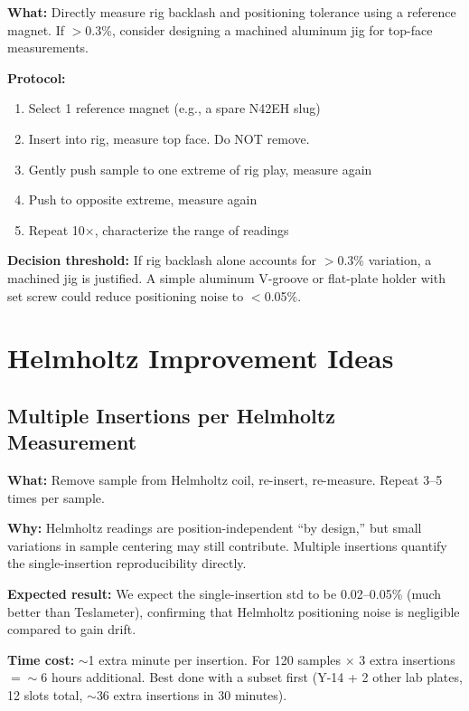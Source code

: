 \documentclass[11pt,letterpaper]{article}
\begin{document}
\textbf{What:} Directly measure rig backlash and positioning tolerance using a
reference magnet. If $>$0.3\%, consider designing a machined aluminum jig for
top-face measurements.

\textbf{Protocol:}
\begin{enumerate}[nosep]
  \item Select 1 reference magnet (e.g., a spare N42EH slug)
  \item Insert into rig, measure top face. Do NOT remove.
  \item Gently push sample to one extreme of rig play, measure again
  \item Push to opposite extreme, measure again
  \item Repeat 10$\times$, characterize the range of readings
\end{enumerate}

\textbf{Decision threshold:} If rig backlash alone accounts for $>$0.3\%
variation, a machined jig is justified. A simple aluminum V-groove or flat-plate
holder with set screw could reduce positioning noise to $<$0.05\%.


\section{Helmholtz Improvement Ideas}
\label{sec:helmholtz-improve}

\subsection{Multiple Insertions per Helmholtz Measurement}
\label{sec:helm-multiinsert}

\textbf{What:} Remove sample from Helmholtz coil, re-insert, re-measure. Repeat
3--5 times per sample.

\textbf{Why:} Helmholtz readings are position-independent ``by design,'' but
small variations in sample centering may still contribute. Multiple insertions
quantify the single-insertion reproducibility directly.

\textbf{Expected result:} We expect the single-insertion std to be 0.02--0.05\%
(much better than Teslameter), confirming that Helmholtz positioning noise is
negligible compared to gain drift.

\textbf{Time cost:} ${\sim}$1 extra minute per insertion. For 120 samples
$\times$ 3 extra insertions $= {\sim}$6 hours additional. Best done with a
subset first (Y-14 + 2 other lab plates, 12 slots total, ${\sim}$36 extra
insertions in 30 minutes).
\end{document}

